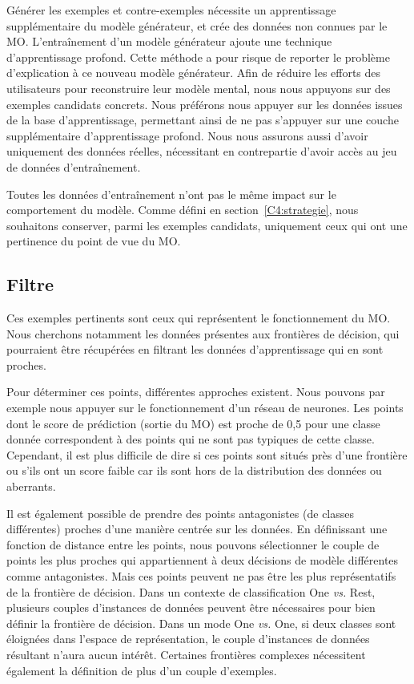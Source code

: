 Générer les exemples et contre-exemples nécessite un apprentissage supplémentaire du modèle générateur, et crée des données non connues par le MO. L'entraînement d'un modèle générateur ajoute une technique d'apprentissage profond. Cette méthode a pour risque de reporter le problème d'explication à ce nouveau modèle générateur. Afin de réduire les efforts des utilisateurs pour reconstruire leur modèle mental, nous nous appuyons sur des exemples candidats concrets.
Nous préférons nous appuyer sur les données issues de la base d'apprentissage, permettant ainsi de ne pas s'appuyer sur une couche supplémentaire d’apprentissage profond. Nous nous assurons aussi d'avoir uniquement des données réelles, nécessitant en contrepartie d'avoir accès au jeu de données d'entraînement.

Toutes les données d'entraînement n'ont pas le même impact sur le comportement du modèle. Comme défini en section~\ref{C4:strategie}, nous souhaitons conserver, parmi les exemples candidats, uniquement ceux qui ont une pertinence du point de vue du MO.

\subsection{Filtre} \label{C4:filtre}

Ces exemples pertinents sont ceux qui représentent le fonctionnement du MO. Nous cherchons notamment les données présentes aux frontières de décision, qui pourraient être récupérées en filtrant les données d'apprentissage qui en sont proches.

Pour déterminer ces points, différentes approches existent. Nous pouvons par exemple nous appuyer sur le fonctionnement d'un réseau de neurones. Les points dont le score de prédiction (sortie du MO) est proche de 0,5 pour une classe donnée correspondent à des points qui ne sont pas typiques de cette classe. Cependant, il est plus difficile de dire si ces points sont situés près d'une frontière ou s'ils ont un score faible car ils sont hors de la distribution des données ou aberrants.

Il est également possible de prendre des points antagonistes (de classes différentes) proches  d'une manière centrée sur les données.
En définissant une fonction de distance entre les points, nous pouvons sélectionner le couple de points les plus proches qui appartiennent à deux décisions de modèle différentes comme antagonistes. Mais ces points peuvent ne pas être les plus représentatifs de la frontière de décision. Dans un contexte de classification One \textit{vs.} Rest, plusieurs couples d'instances de données peuvent être nécessaires pour bien définir la frontière de décision. Dans un mode One \textit{vs.} One, si deux classes sont éloignées dans l'espace de représentation, le couple d'instances de données résultant n'aura aucun intérêt. Certaines frontières complexes nécessitent également la définition de plus d'un couple d'exemples.

